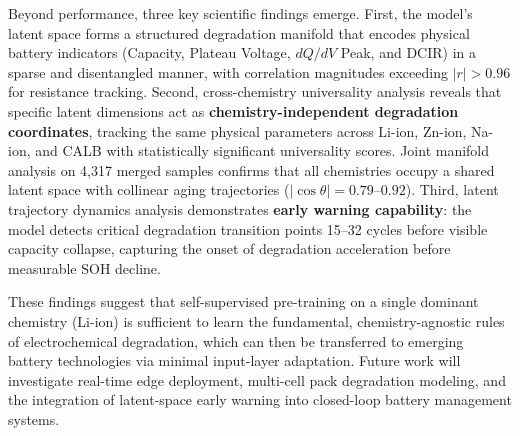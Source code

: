\documentclass[a4paper,fleqn]{cas-dc}
\begin{document}
Beyond performance, three key scientific findings emerge. First, the model's latent space forms a structured degradation manifold that encodes physical battery indicators (Capacity, Plateau Voltage, $dQ/dV$ Peak, and DCIR) in a sparse and disentangled manner, with correlation magnitudes exceeding $|r| > 0.96$ for resistance tracking. Second, cross-chemistry universality analysis reveals that specific latent dimensions act as \textbf{chemistry-independent degradation coordinates}, tracking the same physical parameters across Li-ion, Zn-ion, Na-ion, and CALB with statistically significant universality scores. Joint manifold analysis on 4,317 merged samples confirms that all chemistries occupy a shared latent space with collinear aging trajectories ($|\cos\theta| = 0.79$--$0.92$). Third, latent trajectory dynamics analysis demonstrates \textbf{early warning capability}: the model detects critical degradation transition points 15--32 cycles before visible capacity collapse, capturing the onset of degradation acceleration before measurable SOH decline.

These findings suggest that self-supervised pre-training on a single dominant chemistry (Li-ion) is sufficient to learn the fundamental, chemistry-agnostic rules of electrochemical degradation, which can then be transferred to emerging battery technologies via minimal input-layer adaptation. Future work will investigate real-time edge deployment, multi-cell pack degradation modeling, and the integration of latent-space early warning into closed-loop battery management systems.

\printcredits



\end{document}
